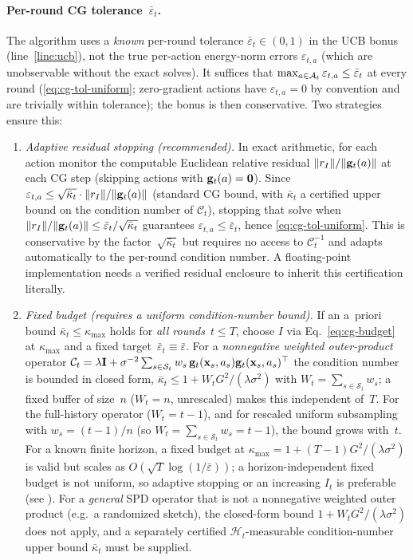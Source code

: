 \documentclass[twoside]{article}
\newcommand{\Calg}{\mathcal{C}}                 %
\newcommand{\cHist}{\mathcal{H}}                %
\begin{document}
\paragraph{Per-round CG tolerance~$\bar\varepsilon_t$.}
The algorithm uses a \emph{known} per-round tolerance
$\bar\varepsilon_t\in(0,1)$ in the UCB bonus (line~\ref{line:ucb}), not the
true per-action energy-norm errors $\varepsilon_{t,a}$ (which are unobservable
without the exact solves).  It suffices that
$\max_{a\in\mathcal{A}_t}\varepsilon_{t,a}\le\bar\varepsilon_t$ at every round
(\eqref{eq:cg-tol-uniform}; zero-gradient actions have $\varepsilon_{t,a}=0$ by
convention and are trivially within tolerance); the bonus is then conservative.
Two strategies ensure this:
\begin{enumerate}[nosep,leftmargin=1.5em]
\item \emph{Adaptive residual stopping (recommended).}
  In exact arithmetic, for each action monitor the computable Euclidean relative residual
  $\|r_I\|/\|\mathbf{g}_t(a)\|$ at each CG step (skipping actions with
  $\mathbf{g}_t(a)=\mathbf0$).  Since
  $\varepsilon_{t,a} \le \sqrt{\bar\kappa_t}\cdot\|r_I\|/\|\mathbf{g}_t(a)\|$
  (standard CG bound, with $\bar\kappa_t$ a certified upper bound on the
  condition number of $\Calg_t$), stopping that solve when
  $\|r_I\|/\|\mathbf{g}_t(a)\| \le \bar\varepsilon_t/\sqrt{\bar\kappa_t}$
  guarantees $\varepsilon_{t,a} \le \bar\varepsilon_t$, hence
  \eqref{eq:cg-tol-uniform}.
  This is conservative by the factor~$\sqrt{\bar\kappa_t}$ but requires
  no access to $\Calg_t^{-1}$ and adapts automatically to the
  per-round condition number.  A floating-point implementation needs a
  verified residual enclosure to inherit this certification literally.
\item \emph{Fixed budget (requires a uniform condition-number bound).}
  If an a~priori bound
  $\bar\kappa_t \le \kappa_{\max}$ holds for \emph{all rounds}~$t\le T$,
  choose $I$ via Eq.~\eqref{eq:cg-budget} at $\kappa_{\max}$ and a fixed
  target~$\bar\varepsilon_t\equiv\bar\varepsilon$.
  For a \emph{nonnegative weighted outer-product} operator
  $\Calg_t=\lambda\bI+\sigma^{-2}\sum_{s\in\mathcal{S}_t}w_s\,
  \bg_t(\bx_s,a_s)\bg_t(\bx_s,a_s)^\top$ the condition number is bounded in
  closed form, $\bar\kappa_t\le 1+W_tG^2/(\lambda\sigma^2)$ with
  $W_t=\sum_{s\in\mathcal{S}_t}w_s$; a fixed buffer of size~$n$ ($W_t=n$,
  unrescaled) makes this independent of~$T$.
  For the full-history operator ($W_t=t{-}1$), and for rescaled uniform
  subsampling with $w_s=(t{-}1)/n$ (so $W_t=\sum_{s\in\mathcal{S}_t}w_s=t{-}1$),
  the bound grows with~$t$.  For a known finite horizon, a fixed budget at
  $\kappa_{\max}=1+(T-1)G^2/(\lambda\sigma^2)$ is valid but scales as
  $O(\sqrt T\log(1/\bar\varepsilon))$; a horizon-independent fixed budget is
  not uniform, so adaptive stopping or an increasing $I_t$ is preferable
  (see ).
  For a \emph{general} SPD operator that is not a nonnegative weighted outer
  product (e.g.\ a randomized sketch), the closed-form bound
  $1+W_tG^2/(\lambda\sigma^2)$ does not apply, and a separately certified
  $\cHist_t$-measurable condition-number upper bound $\bar\kappa_t$ must be
  supplied.
\end{enumerate}
\end{document}
